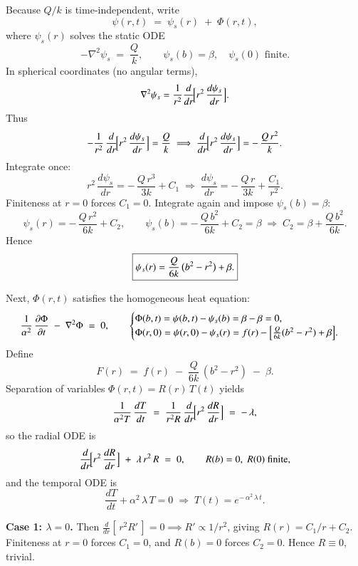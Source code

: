 \documentclass{report}
\begin{document}
Because \(Q/k\) is time‐independent, write
\[
\psi(r,t) \;=\; \psi_{s}(r) \;+\; \Phi(r,t),
\]
where \(\psi_{s}(r)\) solves the static ODE
\[
-\nabla^{2}\psi_{s} \;=\; \frac{Q}{k},
\qquad
\psi_{s}(b) = \beta,\quad \psi_{s}(0)\text{ finite}.
\]
In spherical coordinates (no angular terms),
\[
\nabla^{2}\psi_{s}
= \frac{1}{r^{2}}\frac{d}{dr}\!\Bigl[r^{2}\,\frac{d\psi_{s}}{dr}\Bigr].
\]
Thus
\[
-\frac{1}{r^{2}}\,\frac{d}{dr}\!\Bigl[r^{2}\,\frac{d\psi_{s}}{dr}\Bigr]
= \frac{Q}{k}
\;\Longrightarrow\;
\frac{d}{dr}\!\Bigl[r^{2}\,\frac{d\psi_{s}}{dr}\Bigr]
= -\,\frac{Q\,r^{2}}{k}.
\]
Integrate once:
\[
r^{2}\,\frac{d\psi_{s}}{dr}
= -\,\frac{Q\,r^{3}}{3k} + C_{1}
\;\Longrightarrow\;
\frac{d\psi_{s}}{dr}
= -\,\frac{Q\,r}{3k} + \frac{C_{1}}{r^{2}}.
\]
Finiteness at \(r=0\) forces \(C_{1}=0\).  Integrate again and impose \(\psi_{s}(b)=\beta\):
\[
\psi_{s}(r)
= -\,\frac{Q\,r^{2}}{6k} + C_{2},
\qquad
\psi_{s}(b) = -\,\frac{Q\,b^{2}}{6k} + C_{2} = \beta
\;\Longrightarrow\;
C_{2} = \beta + \frac{Q\,b^{2}}{6k}.
\]
Hence
\[
\boxed{%
\psi_{s}(r)
= \frac{Q}{6k}\,\bigl(b^{2} - r^{2}\bigr) + \beta.
}
\]

Next, \(\Phi(r,t)\) satisfies the homogeneous heat equation:
\[
\frac{1}{\alpha^{2}}\,\frac{\partial \Phi}{\partial t}
\;-\;
\nabla^{2}\Phi \;=\; 0,
\qquad
\begin{cases}
\Phi(b,t) = \psi(b,t) - \psi_{s}(b) = \beta - \beta = 0,\\
\Phi(r,0) = \psi(r,0) - \psi_{s}(r)
= f(r) - \Bigl[\frac{Q}{6k}(b^{2}-r^{2}) + \beta\Bigr].
\end{cases}
\]
Define 
\[
F(r) \;=\; f(r)\;-\;\frac{Q}{6k}\,(b^{2}-r^{2})\;-\;\beta.
\]
Separation of variables \(\Phi(r,t) = R(r)\,T(t)\) yields
\[
\frac{1}{\alpha^{2}T}\,\frac{dT}{dt}
\;=\;
\frac{1}{r^{2}R}\,\frac{d}{dr}\!\Bigl[r^{2}\,\frac{dR}{dr}\Bigr]
\;=\; -\,\lambda,
\]
so the radial ODE is
\[
\frac{d}{dr}\!\Bigl[r^{2}\,\frac{dR}{dr}\Bigr]
\;+\;\lambda\,r^{2}\,R \;=\; 0,
\qquad R(b)=0,\;R(0)\text{ finite},
\]
and the temporal ODE is
\[
\frac{dT}{dt} + \alpha^{2}\,\lambda\,T = 0 \;\Longrightarrow\; T(t) = e^{-\,\alpha^{2}\,\lambda\,t}.
\]

\textbf{Case 1: \(\lambda = 0\).}  Then \(\frac{d}{dr}[\,r^{2}R'\,]=0\implies R'\propto 1/r^{2}\), giving \(R(r)=C_{1}/r + C_{2}\).  Finiteness at \(r=0\) forces \(C_{1}=0\), and \(R(b)=0\) forces \(C_{2}=0\).  Hence \(R\equiv0\), trivial.
\end{document}
